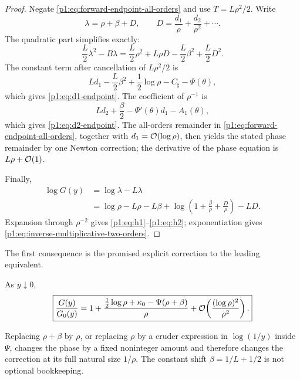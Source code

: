\documentclass[11pt,oneside]{article}
\numberwithin{equation}{section}
\theoremstyle{definition}
\theoremstyle{remark}
\begin{document}
\begin{proof}
Negate \eqref{p1:eq:forward-endpoint-all-orders} and use
$T=L\rho^2/2$.  Write
\begin{equation}
 \lambda=\rho+\beta+D,
 \qquad
 D=\frac{d_1}{\rho}+\frac{d_2}{\rho^2}+\cdots.
 \label{p1:eq:lambda-D}
\end{equation}
The quadratic part simplifies exactly:
\begin{equation}
 \frac L2\lambda^2-B\lambda
 =\frac L2\rho^2+L\rho D-\frac L2\beta^2+\frac L2D^2.
 \label{p1:eq:quadratic-cancellation}
\end{equation}
The constant term after cancellation of $L\rho^2/2$ is
\[
 Ld_1-\frac L2\beta^2+\frac12\log\rho-C_{\sharp}-\Psi(\theta),
\]
which gives \eqref{p1:eq:d1-endpoint}.  The coefficient of $\rho^{-1}$ is
\[
 Ld_2+\frac\beta2-\Psi'(\theta)d_1-A_1(\theta),
\]
which gives \eqref{p1:eq:d2-endpoint}.  The all-orders remainder in
\eqref{p1:eq:forward-endpoint-all-orders}, together with $d_1=\mathcal O(\log\rho)$,
then yields the stated phase remainder by one Newton correction; the derivative of the
phase equation is $L\rho+\mathcal O(1)$.

Finally,
\begin{align*}
 \log G(y)
 &=\log\lambda-L\lambda\\
 &=\log\rho-L\rho-L\beta
   +\log\!\left(1+\frac\beta\rho+\frac D\rho\right)-LD.
\end{align*}
Expansion through $\rho^{-2}$ gives \eqref{p1:eq:h1}--\eqref{p1:eq:h2}; exponentiation
gives \eqref{p1:eq:inverse-multiplicative-two-orders}.
\end{proof}

The first consequence is the promised explicit correction to the leading equivalent.

\begin{corollary}
\label{p1:cor:first-oscillatory-inverse}
As $y\downarrow0$,
\begin{equation}
 \boxed{
 \frac{G(y)}{G_0(y)}
 =1+\frac{\tfrac12\log\rho+\kappa_0-\Psi(\rho+\beta)}{\rho}
 +\mathcal O\!\left(\frac{(\log\rho)^2}{\rho^2}\right).}
 \label{p1:eq:first-oscillatory-inverse}
\end{equation}
\end{corollary}

\begin{remark}
Replacing $\rho+\beta$ by $\rho$, or replacing $\rho$ by a cruder expression in
$\log(1/y)$ inside $\Psi$, changes the phase by a fixed noninteger amount and therefore
changes the correction at its full natural size $1/\rho$.  The constant shift
$\beta=1/L+1/2$ is not optional bookkeeping.
\end{remark}
\end{document}
